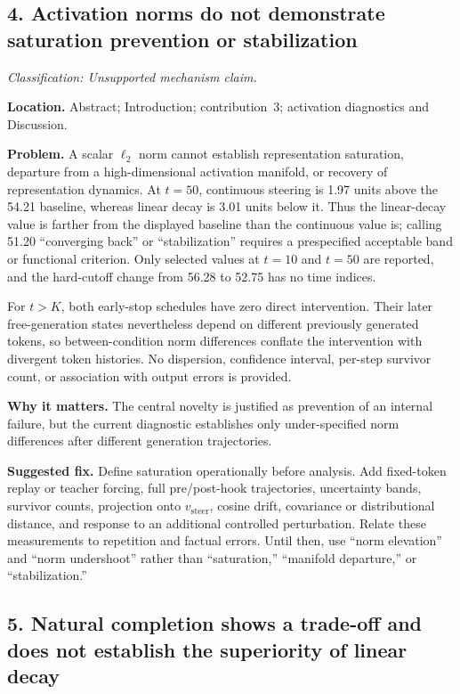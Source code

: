 \documentclass[11pt]{article}
\newcommand{\findinglabel}[1]{\textbf{#1}}
\newcommand{\classification}[1]{\textit{Classification: #1.}}
\begin{document}
\subsection*{4. Activation norms do not demonstrate saturation prevention or stabilization}

\classification{Unsupported mechanism claim}

\findinglabel{Location.} Abstract; Introduction; contribution~3; activation diagnostics and Discussion.

\findinglabel{Problem.} A scalar $\ell_2$ norm cannot establish representation saturation, departure from a high-dimensional activation manifold, or recovery of representation dynamics.  At $t=50$, continuous steering is 1.97 units above the 54.21 baseline, whereas linear decay is 3.01 units below it.  Thus the linear-decay value is farther from the displayed baseline than the continuous value is; calling 51.20 ``converging back'' or ``stabilization'' requires a prespecified acceptable band or functional criterion.  Only selected values at $t=10$ and $t=50$ are reported, and the hard-cutoff change from 56.28 to 52.75 has no time indices.

For $t>K$, both early-stop schedules have zero direct intervention.  Their later free-generation states nevertheless depend on different previously generated tokens, so between-condition norm differences conflate the intervention with divergent token histories.  No dispersion, confidence interval, per-step survivor count, or association with output errors is provided.

\findinglabel{Why it matters.} The central novelty is justified as prevention of an internal failure, but the current diagnostic establishes only under-specified norm differences after different generation trajectories.

\findinglabel{Suggested fix.} Define saturation operationally before analysis.  Add fixed-token replay or teacher forcing, full pre/post-hook trajectories, uncertainty bands, survivor counts, projection onto $v_{\text{steer}}$, cosine drift, covariance or distributional distance, and response to an additional controlled perturbation.  Relate these measurements to repetition and factual errors.  Until then, use ``norm elevation'' and ``norm undershoot'' rather than ``saturation,'' ``manifold departure,'' or ``stabilization.''

\subsection*{5. Natural completion shows a trade-off and does not establish the superiority of linear decay}
\end{document}

